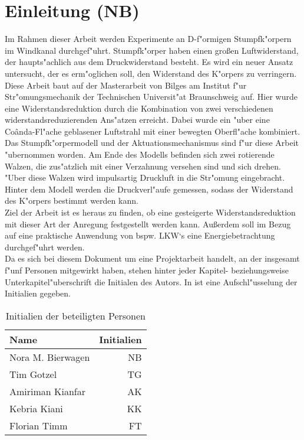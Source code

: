 \chapter{Einleitung (NB)}\label{s:einleitung}
Im Rahmen dieser Arbeit werden Experimente an D-f"ormigen Stumpfk"orpern im Windkanal durchgef"uhrt. Stumpfk"orper haben einen gro\ss{}en Luftwiderstand, der haupts"achlich aus dem Druckwiderstand besteht. Es wird ein neuer Ansatz untersucht, der es erm"oglichen soll, den Widerstand des K"orpers zu verringern.\\
Diese Arbeit baut auf der Masterarbeit von Bilges \cite{Bilges.2018} am Institut f"ur Str"omungsmechanik der Technischen Universit"at Braunschweig auf. Hier wurde eine Widerstandsreduktion durch die Kombination von zwei verschiedenen widerstandsreduzierenden Ans"atzen erreicht. Dabei wurde ein "uber eine Co\^{a}nda-Fl"ache geblasener Luftstrahl mit einer bewegten Oberfl"ache kombiniert. Das Stumpfk"orpermodell und der Aktuationsmechanismus sind f"ur diese Arbeit "ubernommen worden. Am Ende des Modells befinden sich zwei rotierende Walzen, die zus"atzlich mit einer Verzahnung versehen sind und sich drehen. "Uber diese Walzen wird impulsartig Druckluft in die Str"omung eingebracht. Hinter dem Modell werden die Druckverl"aufe gemessen, sodass der Widerstand des K"orpers bestimmt werden kann.\\
Ziel der Arbeit ist es heraus zu finden, ob eine gesteigerte Widerstandsreduktion mit dieser Art der Anregung festgestellt werden kann. Au\ss{}erdem soll im Bezug auf eine praktische Anwendung von bspw. LKW`s eine Energiebetrachtung durchgef"uhrt werden.\\
Da es sich bei diesem Dokument um eine Projektarbeit handelt, an der insgesamt f"unf Personen mitgewirkt haben, stehen hinter jeder Kapitel- beziehungsweise Unterkapitel"uberschrift die Initialen des Autors. In  ist eine Aufschl"usselung der Initialien gegeben.

\begin{table}[h]
	\centering
	\begin{tabular}{lr}
		\toprule
		Name & Initialien\\
		\midrule
		Nora M. Bierwagen & NB\\
		Tim Gotzel & TG\\
		Amiriman Kianfar & AK\\
		Kebria Kiani & KK\\
		Florian Timm & FT\\
		\bottomrule
	\end{tabular}
	\caption{Initialien der beteiligten Personen}
	\label{tab:initialien}
\end{table}

